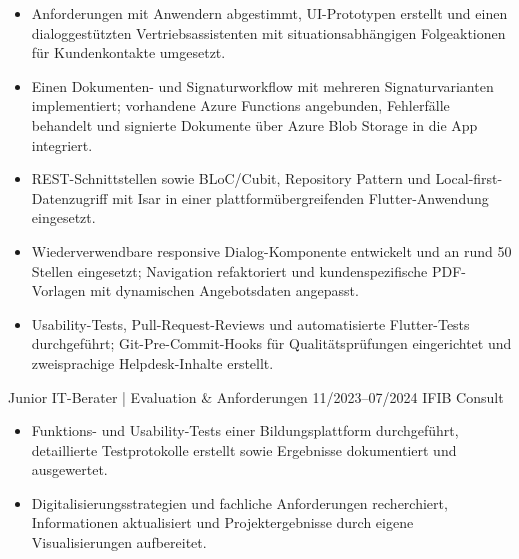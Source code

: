 \begin{itemize}

    \item Anforderungen mit Anwendern abgestimmt,
    UI-Prototypen erstellt und einen
    dialoggestützten Vertriebsassistenten
    mit situationsabhängigen Folgeaktionen
    für Kundenkontakte umgesetzt.

    \item Einen Dokumenten- und Signaturworkflow
    mit mehreren Signaturvarianten implementiert;
    vorhandene Azure Functions
    angebunden, Fehlerfälle behandelt und
    signierte Dokumente über Azure Blob Storage
    in die App integriert.

    \item REST-Schnittstellen sowie
    BLoC/Cubit, Repository Pattern
    und Local-first-Datenzugriff mit
    Isar in einer plattformübergreifenden
    Flutter-Anwendung eingesetzt.

    \item Wiederverwendbare responsive
    Dialog-Komponente entwickelt und an
    rund 50 Stellen eingesetzt;
    Navigation refaktoriert und
    kundenspezifische PDF-Vorlagen mit
    dynamischen Angebotsdaten angepasst.

    \item Usability-Tests, Pull-Request-Reviews
    und automatisierte Flutter-Tests
    durchgeführt; Git-Pre-Commit-Hooks
    für Qualitätsprüfungen eingerichtet
    und zweisprachige Helpdesk-Inhalte erstellt.

\end{itemize}

\cvitem
{Junior IT-Berater | Evaluation \& Anforderungen}
{11/2023--07/2024}
{IFIB Consult}

\begin{itemize}

    \item Funktions- und Usability-Tests einer
    Bildungsplattform durchgeführt,
    detaillierte Testprotokolle erstellt
    sowie Ergebnisse dokumentiert
    und ausgewertet.

    \item Digitalisierungsstrategien und
    fachliche Anforderungen recherchiert,
    Informationen aktualisiert und
    Projektergebnisse durch eigene
    Visualisierungen aufbereitet.

\end{itemize}



